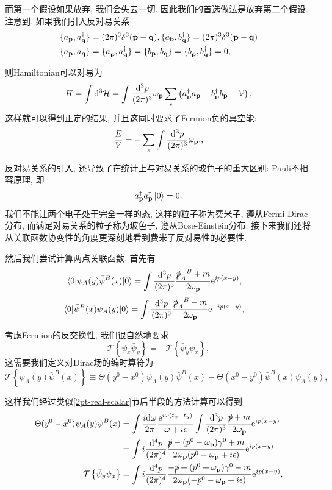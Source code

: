 而第一个假设如果放弃, 我们会失去一切. 因此我们的首选做法是放弃第二个假设. 注意到, 如果我们引入反对易关系:
\begin{align}
    & \{a_{\mathbf{p}}, a_{\mathbf{q}}^\dagger\}=(2\pi)^{3}\delta^3(\mathbf{p}-\mathbf{q}), \{a_{\mathbf{b}}, b_{\mathbf{q}}^\dagger\}=(2\pi)^{3}\delta^3(\mathbf{p}-\mathbf{q})\\
    & \{a_{\mathbf{p}}, a_{\mathbf{q}}\}=\{a_{\mathbf{p}}^\dagger, a_{\mathbf{q}}^\dagger\}=\{b_{\mathbf{p}}, b_{\mathbf{q}}\}=\{b_{\mathbf{p}}^\dagger, b_{\mathbf{q}}^\dagger\}=0,
\end{align}

则Hamiltonian可以对易为
\begin{equation}
    H=\int\mathrm d^3\mathcal H=\int\frac{\mathrm d^3p}{(2\pi)^3}\omega_{\mathbf{p}}\sum_s\left(a_{\mathbf{p}}^\dagger a_{\mathbf{p}}+b_{\mathbf{p}}^\dagger b_{\mathbf{p}}-\mathcal V\right),
\end{equation}
这样就可以得到正定的结果, 并且这同时要求了Fermion负的真空能:
\begin{align}
    \frac{E}{V}=\textcolor{red}{-}\sum_s\int\frac{\mathrm d^3p}{(2\pi)^3}\omega_{\mathbf{p}}.\label{canonical-fermion-vaccum-energy},
\end{align}

反对易关系的引入, 还导致了在统计上与对易关系的玻色子的重大区别: Pauli不相容原理, 即
\begin{equation}
    a_{\mathbf{p}}^\dagger a_{\mathbf{p}}^\dagger\ket0=0.
\end{equation}
我们不能让两个电子处于完全一样的态, 这样的粒子称为费米子, 遵从Fermi-Dirac分布, 而满足对易关系的粒子称为玻色子, 遵从Bose-Einstein分布. 接下来我们还将从关联函数协变性的角度更深刻地看到费米子反对易性的必要性.

然后我们尝试计算两点关联函数, 首先有
\begin{align}
    \braket{0|\psi_A(y)\bar\psi^B(x)|0}&=\int\frac{\mathrm d^3p}{(2\pi)^3}\frac{\slashed p_A^{~~B}+m}{2\omega_{\mathbf{p}}}\mathrm e^{ip(x-y)},
\end{align}
\begin{align}
    \braket{0|\bar\psi^B(x)\psi_A(y)|0}&=\int\frac{\mathrm d^3p}{(2\pi)^3}\frac{\slashed p_A^{~~B}-m}{2\omega_{\mathbf{p}}}\mathrm e^{-ip(x-y)},
\end{align}

考虑Fermion的反交换性, 我们很自然地要求
\begin{equation}
    \mathcal T\left\{\psi_x\bar\psi_y\right\}=-\mathcal T\left\{\bar\psi_y\psi_x\right\},
\end{equation}
这需要我们定义对Dirac场的编时算符为
\begin{equation}
    \mathcal T\left\{\psi_A(y)\bar\psi^B(x)\right\}\equiv\Theta(y^0-x^0)\psi_A(y)\bar\psi^B(x)-\Theta(x^0-y^0)\bar\psi^B(x)\psi_A(y),
\end{equation}

这样我们经过类似\ref{2pt-real-scalar}节后半段的方法计算可以得到
\begin{align}
    \Theta(y^0-x^0)\psi_A(y)\bar\psi^B(x)&=\int\frac{i\d\omega}{2\pi}\frac{\exp{i\omega(t_x-t_y)}}{\omega+i\epsilon}\int\ld p[\slashed p+m]\exp{ip(x-y)}\\
    &=\int i\dddd p\frac{\slashed p-(p^0-\om p)\gamma^0+m}{2\om p(p^0-\om p+i\epsilon)}\exp{ip(x-y)}\label{dirac-spinor-2pt1}\\
    \mathcal T\left\{\bar\psi_y\psi_x\right\}&=\int i\dddd p\frac{-\slashed p+(p^0+\om p)\gamma^0-m}{2\om p(-p^0-\om p+i\epsilon)}\exp{ip(x-y)}\label{dirac-spinor-2pt2},
\end{align}

